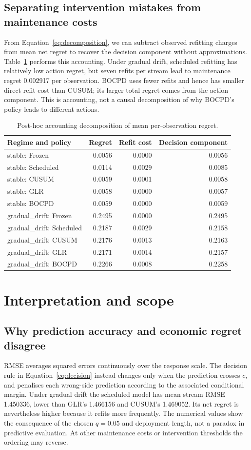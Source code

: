 \documentclass[11pt,a4paper]{article}
\begin{document}
\subsection{Separating intervention mistakes from maintenance costs}
From Equation~\eqref{eq:decomposition}, we can subtract observed refitting charges from mean net regret to recover the decision component without approximations. Table~\ref{tab:components} performs this accounting. Under gradual drift, scheduled refitting has relatively low action regret, but seven refits per stream lead to maintenance regret 0.002917 per observation. BOCPD uses fewer refits and hence has smaller direct refit cost than CUSUM; its larger total regret comes from the action component. This is accounting, not a causal decomposition of why BOCPD's policy leads to different actions.
\begin{table}[ht]\centering\caption{Post-hoc accounting decomposition of mean per-observation regret.}\label{tab:components}\small
\begin{tabular}{lrrr}
\toprule
Regime and policy & Regret & Refit cost & Decision component\\
\midrule
stable: Frozen & 0.0056 & 0.0000 & 0.0056\\
stable: Scheduled & 0.0114 & 0.0029 & 0.0085\\
stable: CUSUM & 0.0059 & 0.0001 & 0.0058\\
stable: GLR & 0.0058 & 0.0000 & 0.0057\\
stable: BOCPD & 0.0059 & 0.0000 & 0.0059\\
gradual\_drift: Frozen & 0.2495 & 0.0000 & 0.2495\\
gradual\_drift: Scheduled & 0.2187 & 0.0029 & 0.2158\\
gradual\_drift: CUSUM & 0.2176 & 0.0013 & 0.2163\\
gradual\_drift: GLR & 0.2171 & 0.0014 & 0.2157\\
gradual\_drift: BOCPD & 0.2266 & 0.0008 & 0.2258\\
\bottomrule
\end{tabular}
\end{table}

\section{Interpretation and scope}\label{sec:discussion}
\subsection{Why prediction accuracy and economic regret disagree}
RMSE averages squared errors continuously over the response scale. The decision rule in Equation~\eqref{eq:decision} instead changes only when the prediction crosses $c$, and penalises each wrong-side prediction according to the associated conditional margin. Under gradual drift the scheduled model has mean stream RMSE 1.450336, lower than GLR's 1.466156 and CUSUM's 1.469052. Its net regret is nevertheless higher because it refits more frequently. The numerical values show the consequence of the chosen $q=0.05$ and deployment length, not a paradox in predictive evaluation. At other maintenance costs or intervention thresholds the ordering may reverse.
\end{document}
